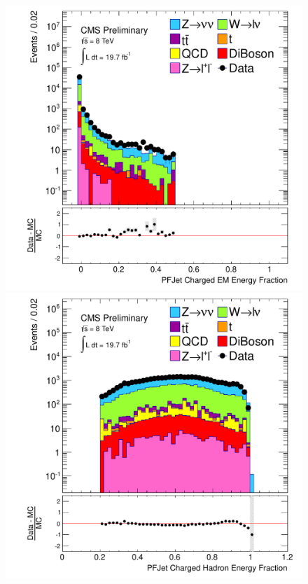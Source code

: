 %
\begin{figure}[!Hhtb]
  \begin{center}
  \includegraphics[scale=0.31]     {Figures/sus13009/nocut/prelimLabels/cut/PFAK5JetChaEmEngFrac.pdf}
  \includegraphics[scale=0.31]     {Figures/sus13009/nocut/prelimLabels/cut/PFAK5JetChaHadEngFrac.pdf}

\end{center}
\end{figure}
